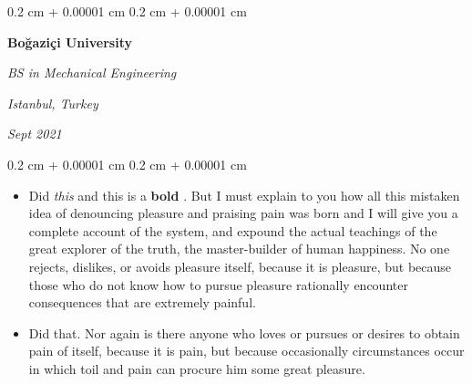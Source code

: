 \documentclass[10pt, letterpaper]{article}
\newenvironment{highlights}{
    \begin{itemize}[
        topsep=0.10 cm,
        parsep=0.10 cm,
        partopsep=0pt,
        itemsep=0pt,
        leftmargin=0.4 cm + 10pt
    ]
}{
    \end{itemize}
} %
\newenvironment{onecolentry}{
    \begin{adjustwidth}{
        0.2 cm + 0.00001 cm
    }{
        0.2 cm + 0.00001 cm
    }
}{
    \end{adjustwidth}
} %
\newenvironment{twocolentry}[2][]{
    \onecolentry
    \def\secondColumn{#2}
    \setcolumnwidth{\fill, 4.5 cm}
    \begin{paracol}{2}
}{
    \switchcolumn \raggedleft \secondColumn
    \end{paracol}
    \endonecolentry
} %
\let\hrefWithoutArrow\href
\renewcommand{\href}[2]{\hrefWithoutArrow{#1}{\ifthenelse{\equal{#2}{}}{ }{#2 }\raisebox{.15ex}{\footnotesize \faExternalLink*}}}
\begin{document}
        \vspace{0.2 cm}

        \begin{twocolentry}{
        \textit{Istanbul, Turkey}    
            
        \textit{Sept 2021}}
            \textbf{Boğaziçi University}

            \textit{BS in Mechanical Engineering}
        \end{twocolentry}
        \vspace{0.10 cm}
        \begin{onecolentry}
            \begin{highlights}
                \item Did \textit{this} and this is a \textbf{bold} \href{https://example.com}{link}. But I must explain to you how all this mistaken idea of denouncing pleasure and praising pain was born and I will give you a complete account of the system, and expound the actual teachings of the great explorer of the truth, the master-builder of human happiness. No one rejects, dislikes, or avoids pleasure itself, because it is pleasure, but because those who do not know how to pursue pleasure rationally encounter consequences that are extremely painful.
                \item Did that. Nor again is there anyone who loves or pursues or desires to obtain pain of itself, because it is pain, but because occasionally circumstances occur in which toil and pain can procure him some great pleasure.
            \end{highlights}
        \end{onecolentry}


        \vspace{0.2 cm}
\end{document}
